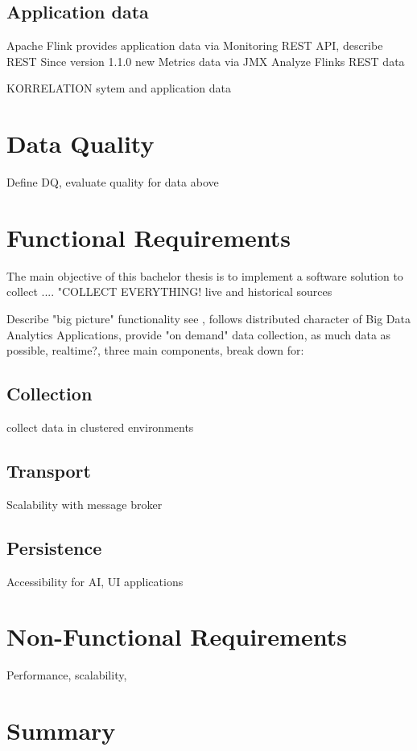 \subsection{Application data}

Apache Flink provides application data via Monitoring REST API, describe REST
Since version 1.1.0 new Metrics data via JMX
Analyze Flinks REST data



KORRELATION sytem and application data

\section{Data Quality}

Define DQ, evaluate quality for data above

\section{Functional Requirements}

The main objective of this bachelor thesis is to implement a software solution to collect ....
"COLLECT EVERYTHING!
live and historical sources

Describe "big picture" functionality see \cite{VanL14}, follows distributed character of Big Data Analytics
Applications, provide "on demand" data collection, as much data as possible, realtime?, three main components,
break down for:

\subsection{Collection}

collect data in clustered environments

\subsection{Transport}

Scalability with message broker

\subsection{Persistence}

Accessibility for AI, UI applications

\section{Non-Functional Requirements}

Performance, scalability,

\section{Summary}